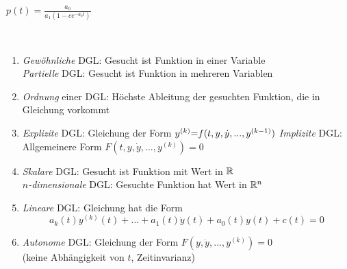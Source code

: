 \documentclass{cheat-sheet}
\begin{document}
\begin{lsg}
  $p(t) = \frac{a_0}{a_1 (1 - c e^{-a_0 t})}$
\end{lsg}

\fi




\begin{defn}\mbox{}\\
  \begin{enumerate}[label=(\Roman*),leftmargin=2em]
    \item \emph{Gewöhnliche} DGL: Gesucht ist Funktion in einer Variable\\
    \emph{Partielle} DGL: Gesucht ist Funktion in mehreren Variablen
    \item \emph{Ordnung} einer DGL: Höchste Ableitung der gesuchten Funktion, die in Gleichung vorkommt
    \item \emph{Explizite} DGL: Gleichung der Form
    $y^{(k)} {=} f(t, y, \dot{y}, ..., y^{(k{-}1)})$
    \emph{Implizite} DGL: Allgemeinere Form $F(t, y, \dot{y}, \ldots, y^{(k)}) = 0$
    \item \emph{Skalare} DGL: Gesucht ist Funktion mit Wert in $\mathbb{R}$\\
    \emph{$n$-dimensionale} DGL: Gesuchte Funktion hat Wert in $\mathbb{R}^n$
    \item \emph{Lineare} DGL: Gleichung hat die Form
    \[ a_k(t) y^{(k)}(t) + \ldots + a_1(t) \dot{y}(t) + a_0(t)y(t) + c(t) = 0 \]
    \item \emph{Autonome} DGL: Gleichung der Form $F(y, \dot{y}, \ldots, y^{(k)}) = 0$\\
    (keine Abhängigkeit von $t$, Zeitinvarianz)
  \end{enumerate}
\end{defn}
\end{document}

